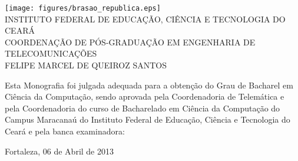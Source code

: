 \begin{folhadeaprovacao}
\setlength{\ABNTsignthickness}{0.2pt}
\setlength{\ABNTsignskip}{1.7cm}

\begin{center}
\texttt{[image: figures/brasao\_republica.eps]}\\

            {INSTITUTO FEDERAL DE EDUCAÇÃO, CIÊNCIA E TECNOLOGIA DO CEARÁ} \\
            {COORDENAÇÃO DE PÓS-GRADUAÇÃO EM ENGENHARIA DE TELECOMUNICAÇÕES}  \\

    \vspace{1.5cm}
                                    {FELIPE MARCEL DE QUEIROZ SANTOS}\\
    \bfseries{}
\end{center}

Esta Monografia foi julgada adequada para a obten\c{c}\~{a}o do Grau de Bacharel em Ciência da Computação, sendo aprovada pela Coordenadoria de Telemática e pela Coordenadoria do curso de Bacharelado em Ciência da Computação do Campus Maracanaú do Instituto Federal de Educação, Ciência e Tecnologia do Ceará e pela banca examinadora:

    \vspace{0.15cm}
    \vspace{0.15cm}%

    \begin{center}
        Fortaleza, 06 de Abril de 2013
    \end{center}
\end{folhadeaprovacao}